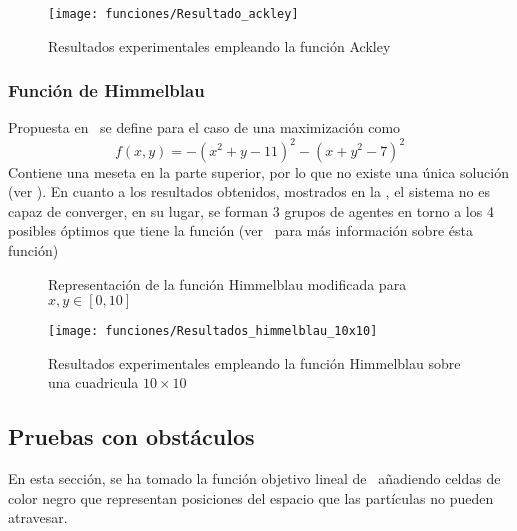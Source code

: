 	\begin{figure}[htbp]
	    \centering
	    \texttt{[image: funciones/Resultado\_ackley]}
	    \caption{Resultados experimentales empleando la función Ackley}
	    \label{fig:3}
	\end{figure}
	
	\subsubsection{Función de Himmelblau} Propuesta en~\cite{HimmelblauFunction} se define para el caso de una maximización como
	\[  f(x,y)=-(x^2 + y - 11)^2 - (x + y^2 - 7)^2  \]
	Contiene una meseta en la parte superior, por lo que no existe una única solución (ver ).
	En cuanto a los resultados obtenidos, mostrados en la , el sistema no es capaz de converger, en su lugar, se forman 3 grupos de agentes en torno a los 4 posibles óptimos que tiene la función (ver~\cite{WebFuncionesOptimizacion} para más información sobre ésta función)
	
	
	\begin{figure}[htbp]
	    \centering
	    \caption{Representación de la función Himmelblau modificada para $x,y\in[0,10]$}
	    \label{fig:4}
	\end{figure}
	
	\begin{figure}[htbp]
	    \centering
	    \texttt{[image: funciones/Resultados\_himmelblau\_10x10]}
	    \caption{Resultados experimentales empleando la función Himmelblau sobre una cuadricula $10\times10$}
	    \label{fig:5}
	\end{figure}
	
	\subsection{Pruebas con obstáculos}
	
	En esta sección, se ha tomado la función objetivo lineal de~\cite{initialPaper} añadiendo celdas de color negro que representan posiciones del espacio que las partículas no pueden atravesar.
	
